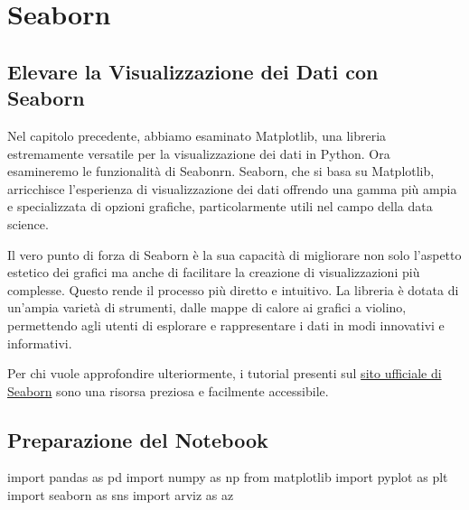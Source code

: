 \documentclass[
  letterpaper,
  krantz2]{{[}./krantz{]}}
\newenvironment{Shaded}{\begin{snugshade}}{\end{snugshade}}
\newcommand{\ImportTok}[1]{\textcolor[rgb]{0.00,0.46,0.62}{#1}}
\newcommand{\NormalTok}[1]{\textcolor[rgb]{0.00,0.23,0.31}{#1}}
\begin{document}
\chapter{Seaborn}\label{sec-seaborn}

\section{Elevare la Visualizzazione dei Dati con
Seaborn}\label{elevare-la-visualizzazione-dei-dati-con-seaborn}

Nel capitolo precedente, abbiamo esaminato Matplotlib, una libreria
estremamente versatile per la visualizzazione dei dati in Python. Ora
esamineremo le funzionalità di Seabonrn. Seaborn, che si basa su
Matplotlib, arricchisce l'esperienza di visualizzazione dei dati
offrendo una gamma più ampia e specializzata di opzioni grafiche,
particolarmente utili nel campo della data science.

Il vero punto di forza di Seaborn è la sua capacità di migliorare non
solo l'aspetto estetico dei grafici ma anche di facilitare la creazione
di visualizzazioni più complesse. Questo rende il processo più diretto e
intuitivo. La libreria è dotata di un'ampia varietà di strumenti, dalle
mappe di calore ai grafici a violino, permettendo agli utenti di
esplorare e rappresentare i dati in modi innovativi e informativi.

Per chi vuole approfondire ulteriormente, i tutorial presenti sul
\href{https://seaborn.pydata.org/}{sito ufficiale di Seaborn} sono una
risorsa preziosa e facilmente accessibile.

\section{Preparazione del Notebook}\label{preparazione-del-notebook-3}

\begin{Shaded}
\begin{Highlighting}[]
\ImportTok{import}\NormalTok{ pandas }\ImportTok{as}\NormalTok{ pd}
\ImportTok{import}\NormalTok{ numpy }\ImportTok{as}\NormalTok{ np}
\ImportTok{from}\NormalTok{ matplotlib }\ImportTok{import}\NormalTok{ pyplot }\ImportTok{as}\NormalTok{ plt}
\ImportTok{import}\NormalTok{ seaborn }\ImportTok{as}\NormalTok{ sns}
\ImportTok{import}\NormalTok{ arviz }\ImportTok{as}\NormalTok{ az}
\end{Highlighting}
\end{Shaded}
\end{document}
